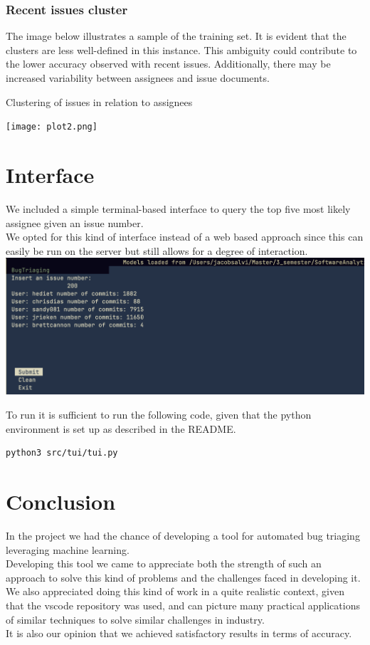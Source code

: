 \documentclass[tikz,10pt,fleqn]{article}
\begin{document}
\subsubsection{Recent issues cluster}
The image below illustrates a sample of the training set. It is evident that the clusters are less well-defined in this instance. This ambiguity could contribute to the lower accuracy observed with recent issues. Additionally, there may be increased variability between assignees and issue documents.
\begin{table}[H]
	\centering
	\caption{Clustering of issues in relation to assignees}
	\texttt{[image: plot2.png]}
\end{table}

\section*{Interface}
We included a simple terminal-based interface to query the top five most likely assignee given an issue number.\\
We opted for this kind of interface instead of a web based approach since this can easily be run on the server but still allows for a degree of interaction.
\includegraphics[width=\textwidth]{./tui.png}

To run it is sufficient to run the following code, given that the python environment is set up as described in the README.
\begin{verbatim}
python3 src/tui/tui.py
\end{verbatim}

\section*{Conclusion}
In the project we had the chance of developing a tool for automated bug triaging leveraging machine learning.\\
Developing this tool we came to appreciate both the strength of such an approach to solve this kind of problems and the challenges faced in developing it.\\
We also appreciated doing this kind of work in a quite realistic context, given that the vscode repository was used, and can picture many practical applications of similar techniques to solve similar challenges in industry.\\
It is also our opinion that we achieved satisfactory results in terms of accuracy.
\end{document}
